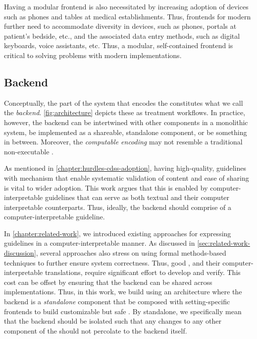 Having a modular frontend is also necessitated by increasing
adoption of devices such as phones and tables at medical establishments.
Thus, frontends for modern \CDSSs{} further need to accommodate
diversity in devices, such as phones, portals at patient's bedside, etc.,
and the associated data entry methods, such as digital keyboards, voice
assistants, etc. Thus, a modular, self-contained frontend is
critical to solving problems with modern \CDSS{} implementations.

\subsection{Backend}\label{sec:backend}

Conceptually, the part of the system that encodes the \BPG{}
constitutes what we call the \emph{backend}. \autoref{fig:architecture}
depicts these as treatment workflows.
In practice, however, the backend can be intertwined with other components in a
monolithic system, be implemented as a shareable,
standalone component, or be something in between. Moreover,
the \emph{computable encoding} may not resemble a traditional
non-executable \BPG{}.

As mentioned in \autoref{chapter:hurdles-cdss-adoption}, having
high-quality, guidelines with mechanism that enable systematic
validation of content and ease of sharing is vital to wider
adoption. This work argues that this is enabled by computer-interpretable guidelines that can serve as
both textual \BPGs{} and their computer interpretable counterparts. Thus,
ideally, the backend should comprise of a computer-interpretable guideline.

In \autoref{chapter:related-work}, we introduced existing approaches
for expressing guidelines in a computer-interpretable manner.
As discussed in \autoref{sec:related-work-discussion}, several
approaches also stress on using formal methods-based techniques to further
ensure system correctness. Thus, good \BPGs{}, and
their computer-interpretable translations, require significant
effort to develop and verify. This cost can be
 offset by ensuring that the backend can be shared
across \CDSSs{} implementations. Thus, in this work, we
build \CDSSs{} using an architecture where the backend
is a \emph{standalone} component that be composed with
setting-specific frontends to build customizable but safe \CDSSs{}.
By standalone, we specifically mean that the backend should be isolated
such that any changes to any other  component of the \CDSSs{}
should not percolate to the backend itself.


